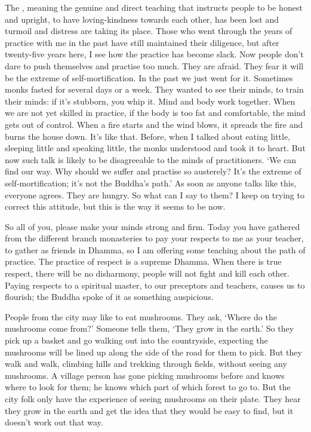 The , meaning the genuine and direct teaching that instructs people to be honest and upright, to have loving-kindness towards each other, has been lost and turmoil and distress are taking its place. Those who went through the years of practice with me in the past have still maintained their diligence, but after twenty-five years here, I see how the practice has become slack. Now people don't dare to push themselves and practise too much. They are afraid. They fear it will be the extreme of self-mortification. In the past we just went for it. Sometimes monks fasted for several days or a week. They wanted to see their minds, to train their minds: if it's stubborn, you whip it. Mind and body work together. When we are not yet skilled in practice, if the body is too fat and comfortable, the mind gets out of control. When a fire starts and the wind blows, it spreads the fire and burns the house down. It's like that. Before, when I talked about eating little, sleeping little and speaking little, the monks understood and took it to heart. But now such talk is likely to be disagreeable to the minds of practitioners. `We can find our way. Why should we suffer and practise so austerely? It's the extreme of self-mortification; it's not the Buddha's path.' As soon as anyone talks like this, everyone agrees. They are hungry. So what can I say to them? I keep on trying to correct this attitude, but this is the way it seems to be now. 

So all of you, please make your minds strong and firm. Today you have gathered from the different branch monasteries to pay your respects to me as your teacher, to gather as friends in Dhamma, so I am offering some teaching about the path of practice. The practice of respect is a supreme Dhamma. When there is true respect, there will be no disharmony, people will not fight and kill each other. Paying respects to a spiritual master, to our preceptors and teachers, causes us to flourish; the Buddha spoke of it as something auspicious. 

People from the city may like to eat mushrooms. They ask, `Where do the mushrooms come from?' Someone tells them, `They grow in the earth.' So they pick up a basket and go walking out into the countryside, expecting the mushrooms will be lined up along the side of the road for them to pick. But they walk and walk, climbing hills and trekking through fields, without seeing any mushrooms. A village person has gone picking mushrooms before and knows where to look for them; he knows which part of which forest to go to. But the city folk only have the experience of seeing mushrooms on their plate. They hear they grow in the earth and get the idea that they would be easy to find, but it doesn't work out that way. 

